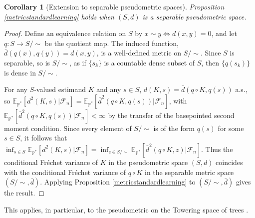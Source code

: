 \documentclass{article}
\newtheorem{cor}{Corollary}
\begin{document}
\begin{cor}[Extension to separable pseudometric spaces]
\label{pseudometriclearning}
Proposition \ref{metricstandardlearning} holds when $(S,d)$ is a separable pseudometric space.
\end{cor}
\begin{proof}
Define an equivalence relation on $S$ by $x \sim y \iff d(x,y)=0$, and let $q:S\to S/{\sim}$ be the quotient map. The induced function, $\bar d(q(x),q(y))=d(x,y)$, is a well-defined metric on $S/{\sim}$. Since $S$ is separable, so is $S/{\sim}$, as if $\{s_k\}$ is a countable dense subset of $S$, then $\{q(s_k)\}$ is dense in $S/{\sim}$.

For any $S$-valued estimand $K$ and any $s\in S$, $d(K,s)=\bar d(q\circ K,q(s))$ a.s., so $\mathbb{E}_{\mathbb{P}^*}[d^2(K,s)|\mathcal{F}_n]= \mathbb{E}_{\mathbb{P}^*}[\bar d^2(q\circ K,q(s))|\mathcal{F}_n]$, with $\mathbb{E}_{\mathbb{P}^*}[\bar d^2(q\circ K,q(s))|\mathcal{F}_n]< \infty$ by the transfer of the basepointed second moment condition. Since every element of $S/{\sim}$ is of the form $q(s)$ for some $s\in S$, it follows that $\inf_{s\in S}
\mathbb{E}_{\mathbb{P}^*}[d^2(K,s)|\mathcal{F}_n] = \inf_{z\in S/{\sim}} \mathbb{E}_{\mathbb{P}^*}[\bar d^2(q\circ K,z)|\mathcal{F}_n]$.
Thus the conditional Fr\'{e}chet variance of $K$ in the pseudometric space $(S,d)$ coincides with the conditional Fr\'{e}chet variance of $q\circ K$ in the separable metric space $(S/{\sim},\bar d)$. Applying Proposition \ref{metricstandardlearning} to $(S/{\sim},\bar d)$ gives the result.
\end{proof}

This applies, in particular, to the pseudometric on the Towering space of trees \citep{cabrera2025geometryspacephylogenetictrees}.



\end{document}
